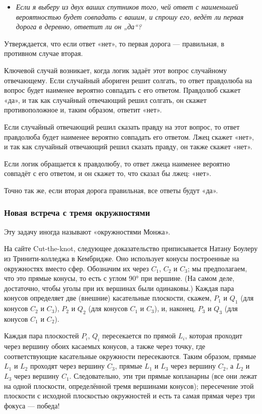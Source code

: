 \begin{itemize}
 \item[] \emph{Если я выберу из двух ваших спутников того, чей ответ с наименьшей вероятностью будет совпадать с вашим, и спрошу его, ведёт ли первая дорога в деревню, ответит ли он „да“?}
\end{itemize}

Утверждается, что если ответ «нет», то первая дорога --- правильная, в противном случае вторая.

Ключевой случай возникает, когда логик задаёт этот вопрос случайному отвечающему.
Если случайный абориген решит солгать, то ответ правдолюба на вопрос будет наименее вероятно совпадать с его ответом.
Правдолюб скажет «да», и так как случайный отвечающий решил солгать, он скажет противоположное и, таким образом, ответит «нет».

Если случайный отвечающий решил сказать правду на этот вопрос, то ответ правдолюба будет наименее вероятно совпадать его ответом.
Лжец скажет «нет», и так как случайный отвечающий решил сказать правду, он также скажет «нет».

Если логик обращается к правдолюбу, то ответ лжеца наименее вероятно совпадёт с его ответом,
и он скажет то, что сказал бы лжец: «нет».

Точно так же, если вторая дорога правильная, все ответы будут «да».

\subsubsection*{Новая встреча с тремя окружностями}

Эту задачу иногда называют «окружностями Монжа».

На сайте Cut-the-knot, следующее доказательство приписывается Натану Боулеру из Тринити-колледжа в Кембридже.
Оно использует конусы построенные на окружностях вместо сфер.
Обозначим их через $C_1$, $C_2$ и $C_3$; мы предполагаем, что это прямые конусы, то есть с углом 90° при вершине.
(На самом деле, достаточно, чтобы уголы при их вершинах были одинаковы.)
Каждая пара конусов определяет две (внешние) касательные плоскости, скажем, $P_1$ и $Q_1$ (для конусов $C_2$ и $C_3$), $P_2$ и $Q_2$ (для конусов $C_1$ и $C_3$), и, наконец, $P_3$ и $Q_3$ (для конусов $C_1$ и $C_2$).

Каждая пара плоскостей $P_i$, $Q_i$ пересекается по прямой $L_i$, которая проходит через вершину обоих касаемых конусов, а также через точку, где соответствующие касательные окружности пересекаются.
Таким образом, прямые $L_1$ и $L_2$ проходят через вершину $C_3$,
прямые $L_1$ и $L_3$ через вершину $C_2$,
а $L_2$ и $L_3$ через вершину $C_1$.
Следовательно, эти три прямые копланарны (все они лежат на одной плоскости, определённой тремя вершинами конусов); пересечение этой плоскости с исходной плоскостью окружностей и есть та самая прямая через три фокуса --- победа!

